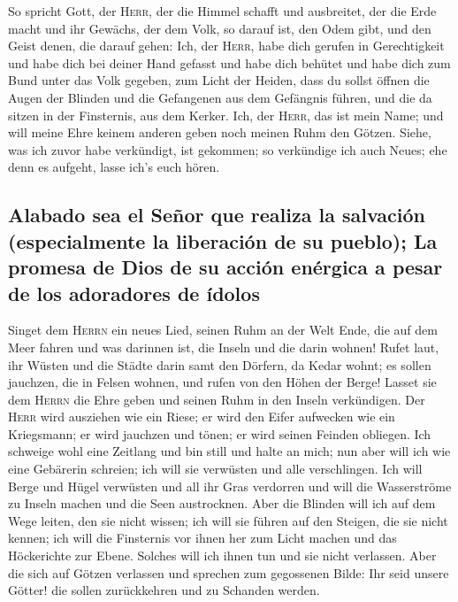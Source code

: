  So spricht Gott, der \textsc{Herr}, der die Himmel
schafft und ausbreitet, der die Erde macht und ihr Gewächs, der dem
Volk, so darauf ist, den Odem gibt, und den Geist denen, die darauf
gehen:  Ich, der \textsc{Herr}, habe dich gerufen in
Gerechtigkeit und habe dich bei deiner Hand gefasst und habe dich
behütet und habe dich zum Bund unter das Volk gegeben, zum Licht der
Heiden,  dass du sollst öffnen die Augen der Blinden und
die Gefangenen aus dem Gefängnis führen, und die da sitzen in der
Finsternis, aus dem Kerker.  Ich, der \textsc{Herr}, das
ist mein Name; und will meine Ehre keinem anderen geben noch meinen Ruhm
den Götzen.  Siehe, was ich zuvor habe verkündigt, ist
gekommen; so verkündige ich auch Neues; ehe denn es aufgeht, lasse ich's
euch hören.

\hypertarget{alabado-sea-el-seuxf1or-que-realiza-la-salvaciuxf3n-especialmente-la-liberaciuxf3n-de-su-pueblo-la-promesa-de-dios-de-su-acciuxf3n-enuxe9rgica-a-pesar-de-los-adoradores-de-uxeddolos}{%
\subsection{Alabado sea el Señor que realiza la salvación (especialmente
la liberación de su pueblo); La promesa de Dios de su acción enérgica a
pesar de los adoradores de
ídolos}\label{alabado-sea-el-seuxf1or-que-realiza-la-salvaciuxf3n-especialmente-la-liberaciuxf3n-de-su-pueblo-la-promesa-de-dios-de-su-acciuxf3n-enuxe9rgica-a-pesar-de-los-adoradores-de-uxeddolos}}

 Singet dem \textsc{Herrn} ein neues Lied, seinen Ruhm an
der Welt Ende, die auf dem Meer fahren und was darinnen ist, die Inseln
und die darin wohnen!  Rufet laut, ihr Wüsten und die
Städte darin samt den Dörfern, da Kedar wohnt; es sollen jauchzen, die
in Felsen wohnen, und rufen von den Höhen der Berge! 
Lasset sie dem \textsc{Herrn} die Ehre geben und seinen Ruhm in den
Inseln verkündigen.  Der \textsc{Herr} wird ausziehen wie
ein Riese; er wird den Eifer aufwecken wie ein Kriegsmann; er wird
jauchzen und tönen; er wird seinen Feinden obliegen.  Ich
schweige wohl eine Zeitlang und bin still und halte an mich; nun aber
will ich wie eine Gebärerin schreien; ich will sie verwüsten und alle
verschlingen.  Ich will Berge und Hügel verwüsten und all
ihr Gras verdorren und will die Wasserströme zu Inseln machen und die
Seen austrocknen.  Aber die Blinden will ich auf dem Wege
leiten, den sie nicht wissen; ich will sie führen auf den Steigen, die
sie nicht kennen; ich will die Finsternis vor ihnen her zum Licht machen
und das Höckerichte zur Ebene. Solches will ich ihnen tun und sie nicht
verlassen.  Aber die sich auf Götzen verlassen und
sprechen zum gegossenen Bilde: Ihr seid unsere Götter! die sollen
zurückkehren und zu Schanden werden.

